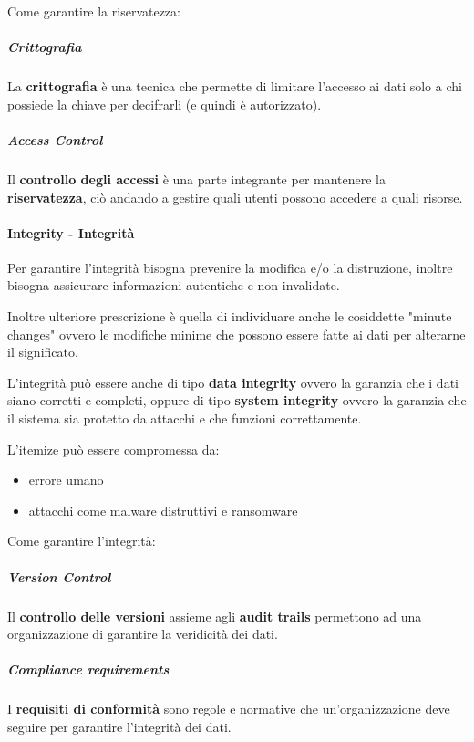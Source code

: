             Come garantire la riservatezza:
            \subparagraph{Crittografia} La \textbf{crittografia} è una tecnica che permette di limitare l'accesso ai dati solo a chi possiede la chiave per decifrarli (e quindi è autorizzato).
            \subparagraph{Access Control} Il \textbf{controllo degli accessi} è una parte integrante per mantenere la \textbf{riservatezza}, ciò andando a gestire quali utenti possono accedere a quali risorse.
        \paragraph{Integrity - Integrità}
            Per garantire l'integrità bisogna prevenire la modifica e/o la distruzione, inoltre bisogna assicurare informazioni autentiche e non invalidate.

            Inoltre ulteriore prescrizione è quella di individuare anche le cosiddette "minute changes" ovvero le modifiche minime che possono essere fatte ai dati per alterarne il significato. 
            
            L'integrità può essere anche di tipo \textbf{data integrity} ovvero la garanzia che i dati siano corretti e completi, oppure di tipo \textbf{system integrity} ovvero la garanzia che il sistema sia protetto da attacchi e che funzioni correttamente.

            L'itemize può essere compromessa da:
            \begin{itemize}
                \item errore umano
                \item attacchi come malware distruttivi e ransomware
            \end{itemize}
            Come garantire l'integrità:
            \subparagraph{Version Control} Il \textbf{controllo delle versioni} assieme agli \textbf{audit trails} permettono ad una organizzazione di garantire la veridicità dei dati.
            \subparagraph{Compliance requirements} I \textbf{requisiti di conformità} sono regole e normative che un'organizzazione deve seguire per garantire l'integrità dei dati.
